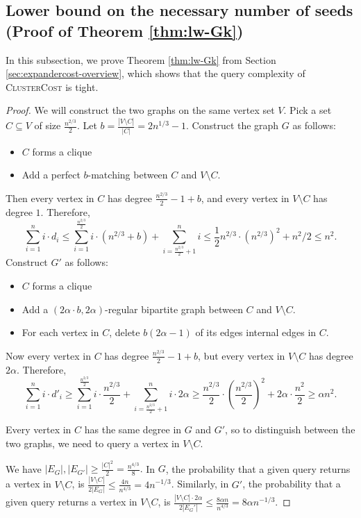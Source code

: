 \documentclass[letterpaper,11pt]{article}
\theoremstyle{plain}
\theoremstyle{definition}
\theoremstyle{remark}
\begin{document}
\subsection{Lower bound on the necessary number of seeds (Proof of Theorem \ref{thm:lw-Gk})}\label{sec:tightrunningtime}
In this subsection, we prove Theorem \ref{thm:lw-Gk} from Section \ref{sec:expandercost-overview}, which shows that the query complexity of \textsc{ClusterCost} is tight. 

\unionclusterableruntimetight*

\begin{proof}
	We will construct the two graphs on the same vertex set $V$. Pick a set $C \subseteq V$ of size $\frac{n^{2/3}}{2}$. Let $b = \frac{|V \setminus C|} {|C|} = 2n^{1/3}-1$. 
 Construct the graph $G$ as follows: 
 \begin{itemize}
 \item $C$ forms a clique
 \item Add a perfect $b$-matching between $C$ and $V \setminus C$. 
 \end{itemize}
Then every vertex in $C$ has degree $\frac{n^{2/3}}{2}-1+b$, and every vertex in $V \setminus C$ has degree $1$. Therefore, 
 \[ \sum_{i=1}^n i \cdot d_i  \leq \sum_{i=1}^{\frac{n^{2/3}}{2}} i \cdot (n^{2/3}+b) + \sum_{i = \frac{n^{2/3}}{2}+1}^n i \leq \frac{1}{2}n^{2/3} \cdot (n^{2/3})^2+n^2/2 \leq n^2. \]
Construct $G'$ as follows: 
 \begin{itemize}
 \item $C$ forms a clique
 \item Add a $(2 \alpha \cdot b, 2\alpha)$-regular bipartite graph between $C$ and $V \setminus C$. 
 \item For each vertex in $C$, delete $b(2 \alpha -1)$ of its edges internal edges in $C$. 
 \end{itemize}
Now every vertex in $C$ has degree $\frac{n^{2/3}}{2}-1+b$, but every vertex in $V \setminus C$ has degree $2 \alpha$.  Therefore, 
\[ \sum_{i=1}^n i \cdot d'_i \geq \sum_{i=1}^{\frac{n^{2/3}}{2}} i \cdot \frac{n^{2/3}}{2} + \sum_{i = \frac{n^{2/3}}{2}+1}^n i \cdot 2 \alpha   \geq \frac{n^{2/3}}{2} \cdot \left(\frac{n^{2/3}}{2} \right)^2  + 2 \alpha \cdot \frac{n^2}{2} \geq \alpha n^2. \]

Every vertex in $C$ has the same degree in $G$ and $G'$, so to distinguish between the two graphs, we need to query a vertex in $V \setminus C$. 
 
  We have $|E_G|, |E_{G'}| \geq \frac{|C|^2}{2}   = \frac{n^{4/3}}{8}.$
  In $G$, the probability that a given query returns a vertex in $V\setminus C$, is $\frac{|V \setminus C|}{2|E_G|} \leq \frac{4n}{n^{4/3}} = 4n^{-1/3}$.  Similarly, in $G'$, the probability that a given query returns a vertex in $V\setminus C$, is $\frac{|V \setminus C|\cdot 2\alpha}{2|E_G'|} \leq  \frac{8 \alpha n}{n^{4/3}}= 8 \alpha n^{-1/3}$. 
  

\end{proof}
\end{document}
